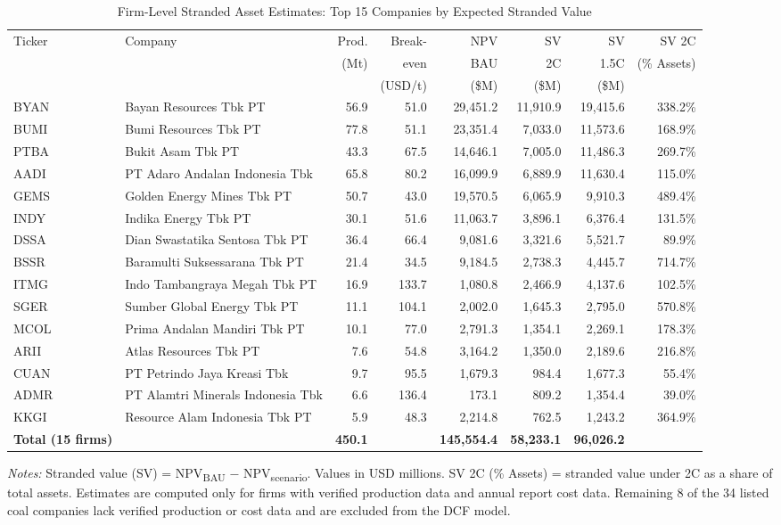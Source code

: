 \begin{table}[htbp]
\centering
\caption{Firm-Level Stranded Asset Estimates: Top 15 Companies by Expected Stranded Value}
\label{tab:firm_sv}
\footnotesize
\begin{tabular}{llrrrrrr}
\toprule
Ticker & Company & Prod. & Break- & NPV & SV & SV & SV 2\textdegree{}C \\
 & & (Mt) & even & BAU & 2\textdegree{}C & 1.5\textdegree{}C & (\% Assets) \\
 & & & (USD/t) & (\$M) & (\$M) & (\$M) & \\
\midrule
  BYAN & Bayan Resources Tbk PT & 56.9 & 51.0 & 29,451.2 & 11,910.9 & 19,415.6 & 338.2\% \\
  BUMI & Bumi Resources Tbk PT & 77.8 & 51.1 & 23,351.4 & 7,033.0 & 11,573.6 & 168.9\% \\
  PTBA & Bukit Asam Tbk PT & 43.3 & 67.5 & 14,646.1 & 7,005.0 & 11,486.3 & 269.7\% \\
  AADI & PT Adaro Andalan Indonesia Tbk & 65.8 & 80.2 & 16,099.9 & 6,889.9 & 11,630.4 & 115.0\% \\
  GEMS & Golden Energy Mines Tbk PT & 50.7 & 43.0 & 19,570.5 & 6,065.9 & 9,910.3 & 489.4\% \\
  INDY & Indika Energy Tbk PT & 30.1 & 51.6 & 11,063.7 & 3,896.1 & 6,376.4 & 131.5\% \\
  DSSA & Dian Swastatika Sentosa Tbk PT & 36.4 & 66.4 & 9,081.6 & 3,321.6 & 5,521.7 & 89.9\% \\
  BSSR & Baramulti Suksessarana Tbk PT & 21.4 & 34.5 & 9,184.5 & 2,738.3 & 4,445.7 & 714.7\% \\
  ITMG & Indo Tambangraya Megah Tbk PT & 16.9 & 133.7 & 1,080.8 & 2,466.9 & 4,137.6 & 102.5\% \\
  SGER & Sumber Global Energy Tbk PT & 11.1 & 104.1 & 2,002.0 & 1,645.3 & 2,795.0 & 570.8\% \\
  MCOL & Prima Andalan Mandiri Tbk PT & 10.1 & 77.0 & 2,791.3 & 1,354.1 & 2,269.1 & 178.3\% \\
  ARII & Atlas Resources Tbk PT & 7.6 & 54.8 & 3,164.2 & 1,350.0 & 2,189.6 & 216.8\% \\
  CUAN & PT Petrindo Jaya Kreasi Tbk & 9.7 & 95.5 & 1,679.3 & 984.4 & 1,677.3 & 55.4\% \\
  ADMR & PT Alamtri Minerals Indonesia Tbk & 6.6 & 136.4 & 173.1 & 809.2 & 1,354.4 & 39.0\% \\
  KKGI & Resource Alam Indonesia Tbk PT & 5.9 & 48.3 & 2,214.8 & 762.5 & 1,243.2 & 364.9\% \\
\midrule
  \textbf{Total (15 firms)} & & \textbf{450.1} & & \textbf{145,554.4} & \textbf{58,233.1} & \textbf{96,026.2} & \\
\bottomrule
\end{tabular}

\smallskip
\noindent \textit{Notes:} Stranded value (SV) = NPV\textsubscript{BAU} $-$ NPV\textsubscript{scenario}. Values in USD millions. SV 2\textdegree{}C (\% Assets) = stranded value under 2\textdegree{}C as a share of total assets. Estimates are computed only for firms with verified production data and annual report cost data. Remaining 8 of the 34 listed coal companies lack verified production or cost data and are excluded from the DCF model.
\end{table}
